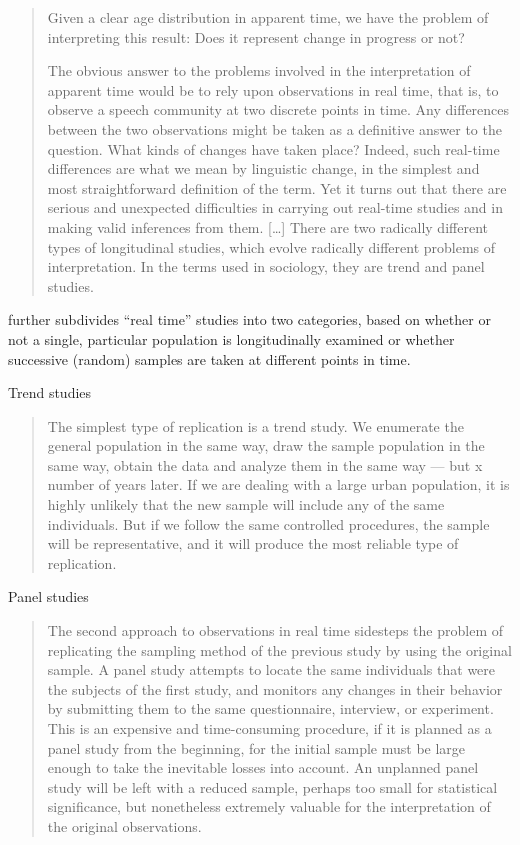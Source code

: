 \documentclass[a4paper,12pt,oneside,leqno]{scrartcl}%
\begin{document}
\begin{quotation}
Given a clear age distribution in apparent time, we have the problem of interpreting this result: Does it represent change in progress or not? 

The obvious answer to the problems involved in the interpretation of apparent time would be to rely upon observations in real time, that is, to observe a speech community at two discrete points in time. Any differences between the two observations might be taken as a definitive answer to the question. What kinds of changes have taken place? Indeed, such real-time differences are what we mean by linguistic change, in the simplest and most straightforward definition of the term. Yet it turns out that there are serious and unexpected difficulties in carrying out real-time studies and in making valid inferences from them. [\ldots{}] There are two radically different types of longitudinal studies, which evolve radically different problems of interpretation. In the terms used in sociology, they are trend and panel studies. \citep[72--75]{labov1994a}
\end{quotation}


\citeauthor{labov1994a} further subdivides ``real time'' studies into two categories, based on whether or not a single, particular population is longitudinally examined or whether successive (random) samples are taken at different points in time. 

\bigskip{}\par{Trend studies}
\begin{quote}
The simplest type of replication is a trend study. We enumerate the general population in the same way, draw the sample population in the same way, obtain the data and analyze them in the same way --- but x number of years later. If we are dealing with a large urban population, it is highly unlikely that the new sample will include any of the same individuals. But if we follow the same controlled procedures, the sample will be representative, and it will produce the most reliable type of replication.
\citep[76]{labov1994a}
\end{quote}

\par{Panel studies}
\begin{quote}
The second approach to observations in real time sidesteps the problem of replicating the sampling method of the previous study by using the original sample. A panel study attempts to locate the same individuals that were the subjects of the first study, and monitors any changes in their behavior by submitting them to the same questionnaire, interview, or experiment. This is an expensive and time-consuming procedure, if it is planned as a panel study from the beginning, for the initial sample must be large enough to take the inevitable losses into account. An unplanned panel study will be left with a reduced sample, perhaps too small for statistical significance, but nonetheless extremely valuable for the interpretation of the original observations.
\citep[76]{labov1994a}
\end{quote}
\end{document}
